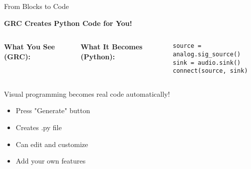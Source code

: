 \documentclass[aspectratio=169,11pt]{beamer}
\newcommand{\highlight}[1]{\colorbox{yellow!30}{#1}}
\begin{document}
\begin{frame}{From Blocks to Code}
\begin{center}
\Large\textbf{GRC Creates Python Code for You!}
\end{center}
\vspace{1em}
\begin{columns}
\textbf{What You See (GRC):}

\textbf{What It Becomes (Python):}
\begin{verbatim}
source = analog.sig_source()
sink = audio.sink()
connect(source, sink)
\end{verbatim}
\end{columns}
\vspace{1em}
\begin{center}
\Large\highlight{Visual programming becomes real code automatically!}
\end{center}
\vspace{0.5em}
\begin{itemize}
    \item Press "Generate" button
    \item Creates .py file
    \item Can edit and customize
    \item Add your own features
\end{itemize}
\end{frame}
\end{document}
